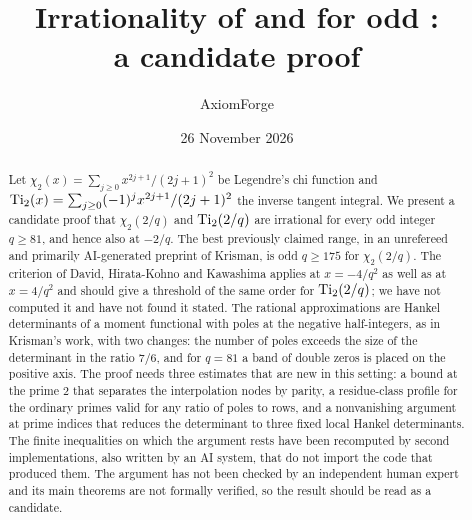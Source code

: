 \documentclass[11pt]{amsart}
\title[Irrationality of Legendre chi and inverse tangent values]%
{\texorpdfstring{Irrationality of \titlechi{} and \titleti{} for odd \titleq:\\ a candidate proof}%
{Irrationality of chi2(2/q) and Ti2(2/q) for odd q >= 81: a candidate proof}}
\author{AxiomForge}
\date{26 November 2026}
\begin{document}
\begin{abstract}
Let $\chi_2(x)=\sum_{j\ge0}x^{2j+1}/(2j+1)^2$ be Legendre's chi function and
$\operatorname{Ti}_2(x)=\sum_{j\ge0}(-1)^jx^{2j+1}/(2j+1)^2$ the inverse tangent integral. We present a
candidate proof that $\chi_2(2/q)$ and $\operatorname{Ti}_2(2/q)$ are irrational for every odd integer
$q\ge 81$, and hence also at $-2/q$. The best previously claimed range, in an unrefereed and
primarily AI-generated preprint of Krisman, is odd $q\ge 175$ for $\chi_2(2/q)$. The criterion of
David, Hirata-Kohno and Kawashima applies at $x=-4/q^2$ as well as at $x=4/q^2$ and should give a
threshold of the same order for $\operatorname{Ti}_2(2/q)$; we have not computed it and have not found it
stated. The rational approximations are Hankel determinants of a
moment functional with poles at the negative half-integers, as in Krisman's work, with two
changes: the number of poles exceeds the size of the determinant in the ratio $7/6$, and for
$q=81$ a band of double zeros is placed on the positive axis. The proof needs three estimates
that are new in this setting: a bound at the prime $2$ that separates the interpolation nodes by
parity, a residue-class profile for the ordinary primes valid for any ratio of poles to rows,
and a nonvanishing argument at prime indices that reduces the determinant to three fixed local
Hankel determinants. The finite inequalities on which the argument rests have been recomputed
by second implementations, also written by an AI system, that do not import the code that
produced them. The argument has not been checked
by an independent human expert and its main theorems are not formally verified, so the result
should be read as a candidate.
\end{abstract}

\affrontmatter











\appendix



\clearpage



\clearpage


\end{document}

